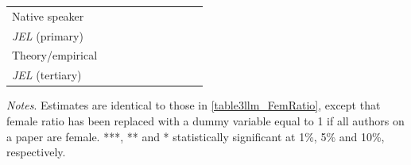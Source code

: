 \begin{table}
\begin{threeparttable}
\begin{tabular}{p{3cm}S@{}S@{}S@{}S@{}S@{}S@{}S@{}S@{}S@{}}
            Native speaker                &               &               &               &               &           {}   &           {}   &           {}   &           {}   &           {}   \\
            \textit{JEL} (primary)        &               &               &               &               &               &               &           {}   &               &               \\
            Theory/empirical              &               &               &               &               &               &               &               &           {}   &               \\
            \textit{JEL} (tertiary)       &               &               &               &               &               &               &               &               &           {}   \\
            \bottomrule
        \end{tabular}
        \begin{tablenotes}
            \tiny
            \item \textit{Notes}. Estimates are identical to those in \autoref{table3llm_FemRatio}, except that female ratio has been replaced with a dummy variable equal to 1 if all authors on a paper are female. ***, ** and * statistically significant at 1\%, 5\% and 10\%, respectively.
        \end{tablenotes}
    \end{threeparttable}

\end{table}
